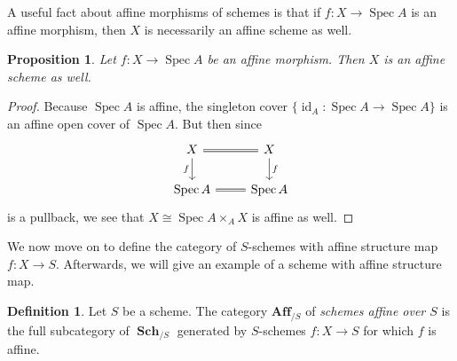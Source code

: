 \documentclass{amsart}
\newtheorem{proposition}[equation]{Proposition}
\theoremstyle{definition}
\newtheorem{definition}[equation]{Definition}
\DeclareMathOperator{\id}{id}
\DeclareMathOperator{\Spec}{Spec}
\DeclareMathOperator{\Sch}{\mathbf{Sch}}
\numberwithin{equation}{subsection}
\begin{document}
A useful fact about affine morphisms of schemes is that if $f:X \to \Spec A$ is an affine morphism, then $X$ is necessarily an affine scheme as well.
\begin{proposition}\label{Prop: Affines over affines are affine}
	Let $f:X \to \Spec A$ be an affine morphism. Then $X$ is an affine scheme as well.
\end{proposition}
\begin{proof}
	Because $\Spec A$ is affine, the singleton cover $\lbrace\id_A:\Spec A \to \Spec A\rbrace$ is an affine open cover of $\Spec A$. But then since
	\[
	\begin{tikzcd}
		X \ar[r, equals] \ar[d, swap]{}{f} & X\ar[d]{}{f} \\
		\Spec A \ar[r, equals] & \Spec A
	\end{tikzcd}
	\]
	is a pullback, we see that $X \cong \Spec A \times_A X$ is affine as well.
\end{proof}


We now move on to define the category of $S$-schemes with affine structure map $f:X\to S$. Afterwards, we will give an example of a scheme with affine structure map.

\begin{definition}
	Let $S$ be a scheme. The category $\mathbf{Aff}_{/S}$ of \emph{schemes affine over $S$} is the full subcategory of $\Sch_{/S}$ generated by $S$-schemes $f:X \to S$ for which $f$ is affine.
\end{definition}
\end{document}
